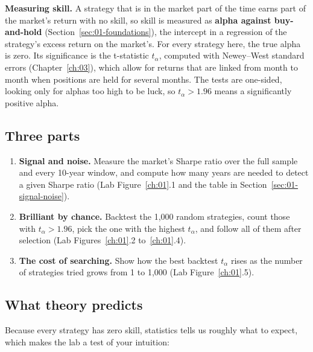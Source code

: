 \textbf{Measuring skill.} A strategy that is in the market part of the time earns part of the market's return with no skill, so skill is measured as \textbf{alpha against buy-and-hold} (Section~\ref{sec:01-foundations}), the intercept in a regression of the strategy's excess return on the market's. For every strategy here, the true alpha is zero. Its significance is the t-statistic $t_\alpha$, computed with Newey--West standard errors (Chapter~\ref{ch:03}), which allow for returns that are linked from month to month when positions are held for several months. The tests are one-sided, looking only for alphas too high to be luck, so $t_\alpha > 1.96$ means a significantly positive alpha.

\subsection*{Three parts}

\begin{enumerate}
  \item \textbf{Signal and noise.} Measure the market's Sharpe ratio over the full sample and every 10-year window, and compute how many years are needed to detect a given Sharpe ratio (Lab Figure~\ref{ch:01}.1 and the table in Section~\ref{sec:01-signal-noise}).
  \item \textbf{Brilliant by chance.} Backtest the 1,000 random strategies, count those with $t_\alpha > 1.96$, pick the one with the highest $t_\alpha$, and follow all of them after selection (Lab Figures~\ref{ch:01}.2 to~\ref{ch:01}.4).
  \item \textbf{The cost of searching.} Show how the best backtest $t_\alpha$ rises as the number of strategies tried grows from 1 to 1,000 (Lab Figure~\ref{ch:01}.5).
\end{enumerate}

\subsection*{What theory predicts}

Because every strategy has zero skill, statistics tells us roughly what to expect, which makes the lab a test of your intuition:

